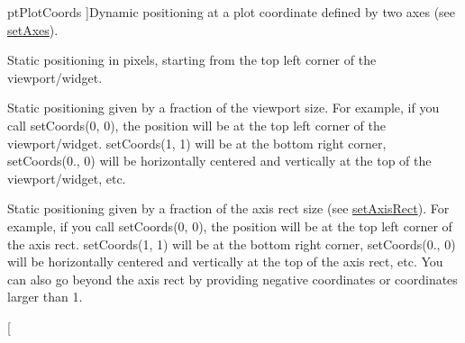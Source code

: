 \begin{Desc}
\begin{description}
{pt\+Plot\+Coords\hypertarget{class_q_c_p_item_position_aad9936c22bf43e3d358552f6e86dbdc8ae797603bd91e9561c0f2da044a30e5c6}{}\label{class_q_c_p_item_position_aad9936c22bf43e3d358552f6e86dbdc8ae797603bd91e9561c0f2da044a30e5c6}
}]Dynamic positioning at a plot coordinate defined by two axes (see \hyperlink{class_q_c_p_item_position_a2185f45c75ac8cb9be89daeaaad50e37}{set\+Axes}). \item[{\em 
pt\+Absolute\hypertarget{class_q_c_p_item_position_aad9936c22bf43e3d358552f6e86dbdc8a3702d60f75c3259c625381c9675c053e}{}\label{class_q_c_p_item_position_aad9936c22bf43e3d358552f6e86dbdc8a3702d60f75c3259c625381c9675c053e}
}]Static positioning in pixels, starting from the top left corner of the viewport/widget. \item[{\em 
pt\+Viewport\+Ratio\hypertarget{class_q_c_p_item_position_aad9936c22bf43e3d358552f6e86dbdc8ad2ec2c0f63a73a94c098af9334903f9b}{}\label{class_q_c_p_item_position_aad9936c22bf43e3d358552f6e86dbdc8ad2ec2c0f63a73a94c098af9334903f9b}
}]Static positioning given by a fraction of the viewport size. For example, if you call set\+Coords(0, 0), the position will be at the top left corner of the viewport/widget. set\+Coords(1, 1) will be at the bottom right corner, set\+Coords(0., 0) will be horizontally centered and vertically at the top of the viewport/widget, etc. \item[{\em 
pt\+Axis\+Rect\+Ratio\hypertarget{class_q_c_p_item_position_aad9936c22bf43e3d358552f6e86dbdc8a5122cb53066293593ba4445ea9a75391}{}\label{class_q_c_p_item_position_aad9936c22bf43e3d358552f6e86dbdc8a5122cb53066293593ba4445ea9a75391}
}]Static positioning given by a fraction of the axis rect size (see \hyperlink{class_q_c_p_item_position_a0cd9b326fb324710169e92e8ca0041c2}{set\+Axis\+Rect}). For example, if you call set\+Coords(0, 0), the position will be at the top left corner of the axis rect. set\+Coords(1, 1) will be at the bottom right corner, set\+Coords(0., 0) will be horizontally centered and vertically at the top of the axis rect, etc. You can also go beyond the axis rect by providing negative coordinates or coordinates larger than 1. \item[{\em 
}
\end{description}
\end{Desc}
